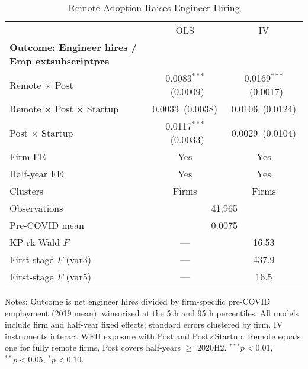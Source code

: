 \begin{table}[htbp]
  \centering
  \caption{Remote Adoption Raises Engineer Hiring}
  \label{tab:engineer_hiring_remote}
  \begin{tabular}{lcc}
    \toprule
    & \multicolumn{1}{c}{OLS} & \multicolumn{1}{c}{IV} \\
    \cmidrule(lr){2-2}\cmidrule(lr){3-3}
    \textbf{Outcome: Engineer hires / Emp	extsubscript{pre}} & & \\
    Remote $\times$ Post & 0.0083$^{***}$\ (0.0009) & 0.0169$^{***}$\ (0.0017) \\
    Remote $\times$ Post $\times$ Startup & 0.0033\ (0.0038) & 0.0106\ (0.0124) \\
    Post $\times$ Startup & 0.0117$^{***}$\ (0.0033) & 0.0029\ (0.0104) \\
    \midrule
    Firm FE & Yes & Yes \\
    Half-year FE & Yes & Yes \\
    Clusters & Firms & Firms \\
    Observations & \multicolumn{2}{c}{41,965} \\
    Pre-COVID mean & \multicolumn{2}{c}{0.0075} \\
    KP rk Wald $F$ & --- & 16.53 \\
    First-stage $F$ (var3) & --- & 437.9 \\
    First-stage $F$ (var5) & --- & 16.5 \\
    \bottomrule
  \end{tabular}
  \begin{minipage}{0.9\textwidth}
    \vspace{0.5em}
    {\footnotesize Notes: Outcome is net engineer hires divided by firm-specific pre-COVID employment (2019 mean), winsorized at the 5th and 95th percentiles. All models include firm and half-year fixed effects; standard errors clustered by firm. IV instruments interact WFH exposure with Post and Post$\times$Startup. Remote equals one for fully remote firms, Post covers half-years $\geq$ 2020H2. $^{***}p<0.01$, $^{**}p<0.05$, $^{*}p<0.10$.}
  \end{minipage}
\end{table}